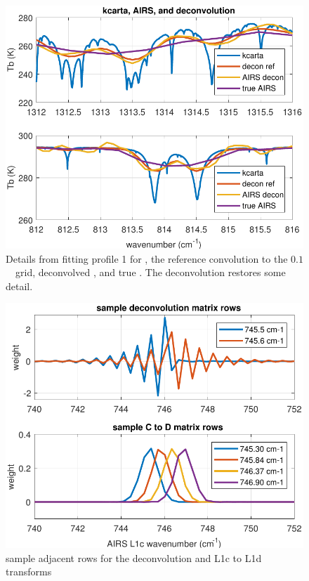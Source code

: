 \documentclass[journal]{IEEEtran}
\begin{document}
\begin{figure} %
  \centering
  \includegraphics[width=\linewidth]{figures/airs_decon_zoom.pdf}
  \caption{Details from fitting profile 1 for {\kcarta}, the
    reference convolution to the $0.1$~\wn\ grid, deconvolved
    {\airs}, and true {\airs}.  The deconvolution restores some
    detail.}
  \label{dzoom}
\end{figure}

\begin{figure} %
  \centering
  \includegraphics[width=\linewidth]{figures/airs_decon_basis.pdf}
  \caption{sample adjacent rows for the deconvolution and L1c to L1d
    transforms}
  \label{dbasis}
\end{figure}
\end{document}
